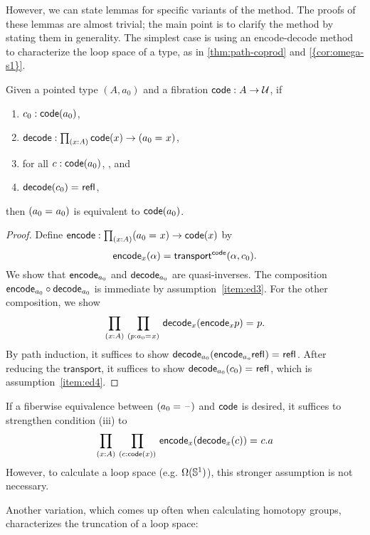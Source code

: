However, we can state lemmas for specific variants of the method.
The proofs of these lemmas are almost trivial; the main point is to
clarify the method by stating them in generality.  The simplest
case is using an encode-decode method to characterize the loop space of a
type, as in \cref{thm:path-coprod} and \cref{{cor:omega-s1}}.

\begin{lem}
Given a pointed type $(A,a_0)$ and a fibration
$\mathsf{code} : A \to \mathcal{U}$, if 
\begin{enumerate}
\item $c_0 : \mathsf{code}(a_0)$,\label{item:ed1}
\item $\decode : \prd{x:A} \code(x) \to (\id{a_0}{x})$,\label{item:ed2}
\item for all $c : \mathsf{code}(a_0)$, , and\label{item:ed3}
\item $\mathsf{decode}(c_0) =_{} \mathsf{refl}_{}$,\label{item:ed4}
\end{enumerate}
then $(a_0 =_{} a_0)$ is equivalent to $\mathsf{code}(a_0)$.
\end{lem}

\begin{proof}
Define
$\encode : \prd{x:A} (\id{a_0}{x}) \to \code(x)$ by
\[
\mathsf{encode}_x(\alpha) = \mathsf{transport}^{\mathsf{code}}(\alpha,c_0).
\]
We show that $\mathsf{encode}_{a_0}$ and $\mathsf{decode}_{a_0}$ are quasi-inverses.  
The composition $\mathsf{encode}_{a_0} \circ \mathsf{decode}_{a_0}$ is immediate by
assumption~\ref{item:ed3}.  For the other composition, we show
\[
\prd{x:A}{p : \id{a_0}{x}} \id{\decode_{x} (\encode_{x} p)}{p}.
\] 
By path induction, it suffices to show 
${\mathsf{decode}_{{a_0}} (\mathsf{encode}_{{a_o}} \mathsf{refl}_{})} =_{} \mathsf{refl}_{}$.
After reducing the $\mathsf{transport}$, it suffices to show 
${\mathsf{decode}_{{a_0}} (c_0)} =_{} \mathsf{refl}_{}$, which is assumption~\ref{item:ed4}.
\end{proof}

If a fiberwise equivalence between $(a_0 =_{} \mathord{\hspace{1pt}\text{--}\hspace{1pt}})$ and $\mathsf{code}$ is desired,
it suffices to strengthen condition (iii) to
\[
\prd{x:A}{c : \code(x)} \id{\encode_{x}(\decode_{x}(c))}{c}.a
\]
However, to calculate a loop space (e.g. $\Omega(\mathbb{S} ^1)$), this
stronger assumption is not necessary.  

Another variation, which comes up often when calculating homotopy
groups, characterizes the truncation of a loop space:

